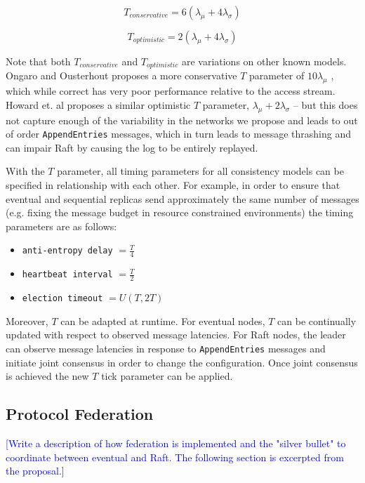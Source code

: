 \documentclass[10pt,conference,letterpaper]{IEEEtran}
\newcommand{\note}[1]{\textcolor{blue}{[#1]}}
\begin{document}
\begin{equation}
    T_{conservative} = 6(\lambda_{\mu} + 4\lambda_{\sigma})
\end{equation}

\begin{equation}
    T_{optimistic} = 2(\lambda_{\mu} + 4\lambda_{\sigma})
\end{equation}

Note that both $T_{conservative}$ and $T_{optimistic}$ are variations on other known models. Ongaro and Ousterhout proposes a more conservative $T$ parameter of $10\lambda_{\mu}$ \cite{ongaro_search_2014}, which while correct has very poor performance relative to the access stream. Howard et. al proposes a similar optimistic $T$ parameter, $\lambda_{\mu} + 2\lambda_{\sigma}$ \cite{howard_raft_2015} -- but this does not capture enough of the variability in the networks we propose and leads to out of order \texttt{AppendEntries} messages, which in turn leads to message thrashing and can impair Raft by causing the log to be entirely replayed.

With the $T$ parameter, all timing parameters for all consistency models can be specified in relationship with each other. For example, in order to ensure that eventual and sequential replicas send approximately the same number of messages (e.g. fixing the message budget in resource constrained environments) the timing parameters are as follows:

\begin{itemize}
    \item \texttt{anti-entropy delay} $= \frac{T}{4}$
    \item \texttt{heartbeat interval} $= \frac{T}{2}$
    \item \texttt{election timeout} $= U(T, 2T)$
\end{itemize}

Moreover, $T$ can be adapted at runtime. For eventual nodes, $T$ can be continually updated with respect to observed message latencies. For Raft nodes, the leader can observe message latencies in response to \texttt{AppendEntries} messages and initiate joint consensus in order to change the configuration. Once joint consensus is achieved the new $T$ tick parameter can be applied.

\subsection{Protocol Federation}

\note{Write a description of how federation is implemented and the "silver bullet" to coordinate between eventual and Raft. The following section is excerpted from the proposal.}
\end{document}
